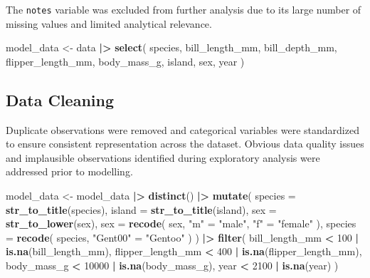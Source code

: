 \documentclass[
]{article}
\newenvironment{Shaded}{\begin{snugshade}}{\end{snugshade}}
\newcommand{\AttributeTok}[1]{\textcolor[rgb]{0.13,0.29,0.53}{#1}}
\newcommand{\DecValTok}[1]{\textcolor[rgb]{0.00,0.00,0.81}{#1}}
\newcommand{\FunctionTok}[1]{\textcolor[rgb]{0.13,0.29,0.53}{\textbf{#1}}}
\newcommand{\NormalTok}[1]{#1}
\newcommand{\OtherTok}[1]{\textcolor[rgb]{0.56,0.35,0.01}{#1}}
\newcommand{\SpecialCharTok}[1]{\textcolor[rgb]{0.81,0.36,0.00}{\textbf{#1}}}
\newcommand{\StringTok}[1]{\textcolor[rgb]{0.31,0.60,0.02}{#1}}
\begin{document}
The \texttt{notes} variable was excluded from further analysis due to
its large number of missing values and limited analytical relevance.

\begin{Shaded}
\begin{Highlighting}[]
\NormalTok{model\_data }\OtherTok{\textless{}{-}}\NormalTok{ data }\SpecialCharTok{|\textgreater{}}
  \FunctionTok{select}\NormalTok{(}
\NormalTok{    species,}
\NormalTok{    bill\_length\_mm,}
\NormalTok{    bill\_depth\_mm,}
\NormalTok{    flipper\_length\_mm,}
\NormalTok{    body\_mass\_g,}
\NormalTok{    island,}
\NormalTok{    sex,}
\NormalTok{    year}
\NormalTok{  )}
\end{Highlighting}
\end{Shaded}

\subsection{Data Cleaning}\label{data-cleaning-1}

Duplicate observations were removed and categorical variables were
standardized to ensure consistent representation across the dataset.
Obvious data quality issues and implausible observations identified
during exploratory analysis were addressed prior to modelling.

\begin{Shaded}
\begin{Highlighting}[]
\NormalTok{model\_data }\OtherTok{\textless{}{-}}\NormalTok{ model\_data }\SpecialCharTok{|\textgreater{}}
  \FunctionTok{distinct}\NormalTok{() }\SpecialCharTok{|\textgreater{}}
  \FunctionTok{mutate}\NormalTok{(}
    \AttributeTok{species =} \FunctionTok{str\_to\_title}\NormalTok{(species),}
    \AttributeTok{island =} \FunctionTok{str\_to\_title}\NormalTok{(island),}
    \AttributeTok{sex =} \FunctionTok{str\_to\_lower}\NormalTok{(sex),}
    \AttributeTok{sex =} \FunctionTok{recode}\NormalTok{(}
\NormalTok{      sex,}
      \StringTok{"m"} \OtherTok{=} \StringTok{"male"}\NormalTok{,}
      \StringTok{"f"} \OtherTok{=} \StringTok{"female"}
\NormalTok{    ),}
    \AttributeTok{species =} \FunctionTok{recode}\NormalTok{(}
\NormalTok{      species,}
      \StringTok{"Gent00"} \OtherTok{=} \StringTok{"Gentoo"}
\NormalTok{    )}
\NormalTok{  ) }\SpecialCharTok{|\textgreater{}}
  \FunctionTok{filter}\NormalTok{(}
\NormalTok{    bill\_length\_mm }\SpecialCharTok{\textless{}} \DecValTok{100} \SpecialCharTok{|} \FunctionTok{is.na}\NormalTok{(bill\_length\_mm),}
\NormalTok{    flipper\_length\_mm }\SpecialCharTok{\textless{}} \DecValTok{400} \SpecialCharTok{|} \FunctionTok{is.na}\NormalTok{(flipper\_length\_mm),}
\NormalTok{    body\_mass\_g }\SpecialCharTok{\textless{}} \DecValTok{10000} \SpecialCharTok{|} \FunctionTok{is.na}\NormalTok{(body\_mass\_g),}
\NormalTok{    year }\SpecialCharTok{\textless{}} \DecValTok{2100} \SpecialCharTok{|} \FunctionTok{is.na}\NormalTok{(year)}
\NormalTok{  )}
\end{Highlighting}
\end{Shaded}
\end{document}
